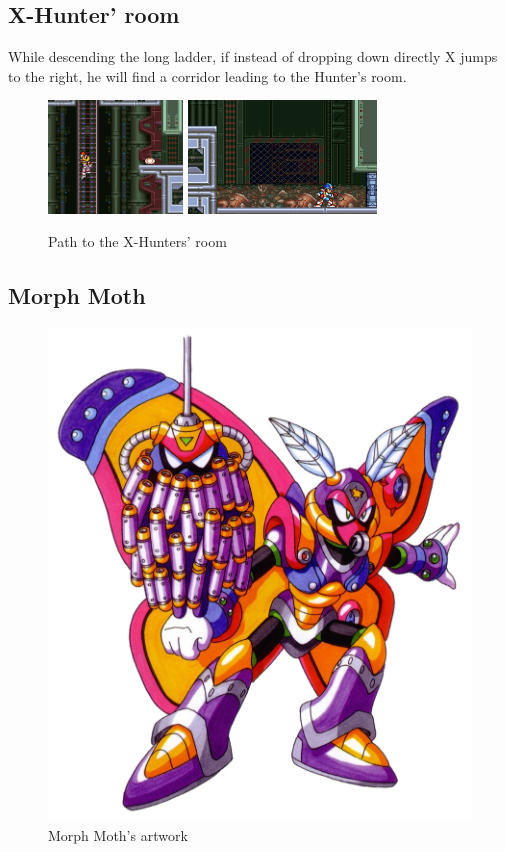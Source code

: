 \subsection{X-Hunter' room}
While descending  the long ladder, if instead of dropping down directly X jumps to the right, 
he will find a corridor leading to the Hunter's room.
\begin{figure}[htp]
	\centering
	\includegraphics[height=3cm]{figures/X2/Morph_moth/Moth_hunter_entrance.jpg}
	\includegraphics[height=3cm]{figures/X2/Morph_moth/Moth_hunter_room.jpg}
	\caption{Path to the X-Hunters' room}
\end{figure}


\subsection{Morph Moth}\label{boss:Morph_moth}
\begin{figure}[htp]
	\centering
	\includegraphics[height=\portraitsize]{figures/X2/Morph_moth/Morph_Moth.png}
	\caption{Morph Moth's artwork~\cite{book:MMX_Complete_art}}
\end{figure}

